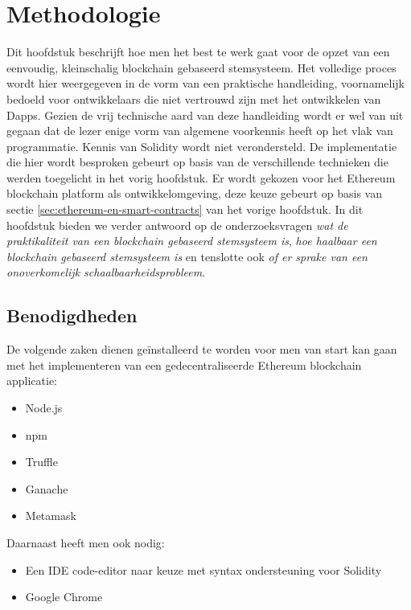 
\chapter{Methodologie}
\label{ch:methodologie}

Dit hoofdstuk beschrijft hoe men het best te werk gaat voor de opzet van een eenvoudig, kleinschalig blockchain gebaseerd stemsysteem. Het volledige proces wordt hier weergegeven in de vorm van een praktische handleiding,  voornamelijk bedoeld voor ontwikkelaars die niet vertrouwd zijn met het ontwikkelen van Dapps. Gezien de vrij technische aard van deze handleiding wordt er wel van uit gegaan dat de lezer enige vorm van algemene voorkennis heeft op het vlak van programmatie. Kennis van Solidity wordt niet verondersteld. De implementatie die hier wordt besproken gebeurt op basis van de verschillende technieken die werden toegelicht in het vorig hoofdstuk. Er wordt gekozen voor het Ethereum blockchain platform als ontwikkelomgeving, deze keuze gebeurt op basis van sectie \ref{sec:ethereum-en-smart-contracts} van het vorige hoofdstuk. In dit hoofdstuk bieden we verder antwoord op de onderzoeksvragen \textit{wat de praktikaliteit van een blockchain gebaseerd stemsysteem is}, \textit{hoe haalbaar een blockchain gebaseerd stemsysteem is} en tenslotte ook \textit{of er sprake van een onoverkomelijk schaalbaarheidsprobleem}.

\section{Benodigdheden}
\label{sec:benodigdheden}
De volgende zaken dienen geïnstalleerd te worden voor men van start kan gaan met het implementeren van een gedecentraliseerde Ethereum blockchain applicatie:
\begin{itemize}
	\item{Node.js}
	\item{npm}
	\item{Truffle}
	\item{Ganache}
	\item{Metamask}
\end{itemize}
Daarnaast heeft men ook nodig:
\begin{itemize}
	\item{Een IDE code-editor naar keuze met syntax ondersteuning voor Solidity}
	\item{Google Chrome}
\end{itemize}

